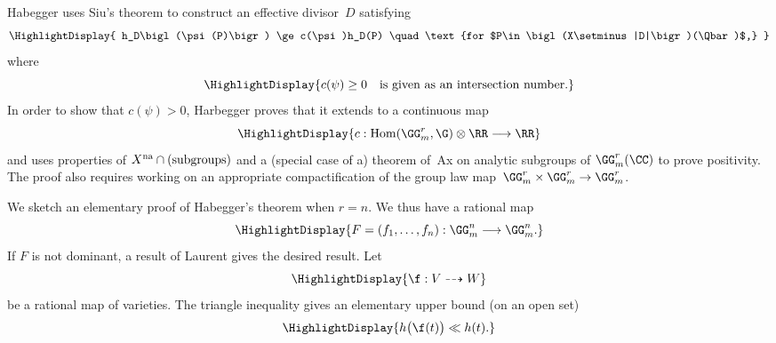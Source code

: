 \documentclass[12pt]{article}
\newcommand{\oa}{\textup{na}}
\begin{document}
\BeginSlide
{}
Habegger uses Siu's theorem to construct an effective divisor~$D$
satisfying
\[\HighlightDisplay{
  h_D\bigl(\psi(P)\bigr) \ge c(\psi)h_D(P)
  \quad\text{for $P\in \bigl(X\setminus|D|\bigr)(\Qbar)$,}
  }
\]
where
\[\HighlightDisplay{
  c(\psi) \ge 0\quad\text{is given as an intersection number.}
  }
\]
\EndPart
\vspace{-5pt}
In order to show that $c(\psi)>0$, Harbegger proves that it extends to
a continuous map
\[\HighlightDisplay{
  c : \operatorname{Hom}(\GG_m^r,\G)\otimes\RR \longrightarrow\RR
  }
\]
and uses properties of $X^{\oa}\cap(\text{subgroups})$ 
and a (special case of a) theorem of~Ax 
on analytic subgroups of $\GG_m^r(\CC)$ to prove positivity.
\EndPart
\vspace{5pt}
The proof also requires working on an appropriate compactification 
of the group law map~$\GG_m^r\times\GG_m^r\to\GG_m^r$.
\EndSlide

\BeginSlide
{}
We sketch an elementary proof of Habegger's theorem when $r=n$.
We thus have a rational map
\[\HighlightDisplay{
  F = (f_1,\ldots,f_n) : \GG_m^n \longrightarrow \GG_m^n.
  }
\]
\EndPart
\vspace{-10pt}
If $F$ is not dominant,  a result of Laurent gives the desired
result.
Let
\[\HighlightDisplay{
  \f : V \dashrightarrow W
  }
\]
be a rational map of varieties. The triangle inequality gives an
elementary upper bound (on an open set)
\[\HighlightDisplay{
  h\bigl(\f(t)\bigr) \ll h(t).
  }
\]
\EndPart
\vspace{-22pt}
\EndSlide
\end{document}
